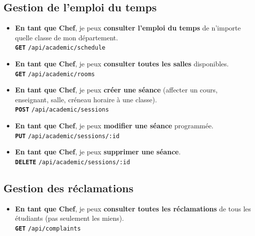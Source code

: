 \documentclass[12pt,a4paper]{article}
\newcommand{\route}[1]{\texorpdfstring{\texttt{\small\color{routeGray}#1}}{#1}}
\newcommand{\httpmethod}[1]{%
  \ifstrequal{#1}{GET}{\colorbox{blue!15}{\texttt{\bfseries\color{blue!70!black}GET}}}{}%
  \ifstrequal{#1}{POST}{\colorbox{green!18}{\texttt{\bfseries\color{green!60!black}POST}}}{}%
  \ifstrequal{#1}{PUT}{\colorbox{orange!18}{\texttt{\bfseries\color{orange!70!black}PUT}}}{}%
  \ifstrequal{#1}{DELETE}{\colorbox{red!15}{\texttt{\bfseries\color{red!70!black}DELETE}}}{}%
}
\newcommand{\usmark}{\color{accentGold}$\blacktriangleright$\;}
\begin{document}
\begin{chefbox}
\subsection*{Gestion de l'emploi du temps}

\begin{itemize}[leftmargin=1.2cm, labelsep=0.4cm]
  \item[\usmark] \textbf{En tant que Chef}, je peux \textbf{consulter l'emploi du temps} de n'importe quelle classe de mon département.\\
    \httpmethod{GET} \route{/api/academic/schedule}

  \item[\usmark] \textbf{En tant que Chef}, je peux \textbf{consulter toutes les salles} disponibles.\\
    \httpmethod{GET} \route{/api/academic/rooms}

  \item[\usmark] \textbf{En tant que Chef}, je peux \textbf{créer une séance} (affecter un cours, enseignant, salle, créneau horaire à une classe).\\
    \httpmethod{POST} \route{/api/academic/sessions}

  \item[\usmark] \textbf{En tant que Chef}, je peux \textbf{modifier une séance} programmée.\\
    \httpmethod{PUT} \route{/api/academic/sessions/:id}

  \item[\usmark] \textbf{En tant que Chef}, je peux \textbf{supprimer une séance}.\\
    \httpmethod{DELETE} \route{/api/academic/sessions/:id}
\end{itemize}

\subsection*{Gestion des réclamations}

\begin{itemize}[leftmargin=1.2cm, labelsep=0.4cm]
  \item[\usmark] \textbf{En tant que Chef}, je peux \textbf{consulter toutes les réclamations} de tous les étudiants (pas seulement les miens).\\
    \httpmethod{GET} \route{/api/complaints}


\end{itemize}
\end{chefbox}
\end{document}
